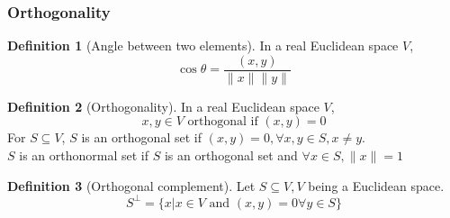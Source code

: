 \documentclass[twoside]{amsart}
\theoremstyle{plain}
\theoremstyle{definition}
\newtheorem{definition}{Definition}
\begin{document}
\subsubsection{Orthogonality}
\begin{definition}[Angle between two elements]
  In a real Euclidean space $V$, 
  \begin{equation}
    \cos{\theta} = \frac{(x,y)}{ \| x \| \| y \| }
  \end{equation}
\end{definition}

\begin{definition}[Orthogonality]
  In a real Euclidean space $V$,
  \begin{equation}
    x,y \in V \text{ orthogonal if } (x,y) = 0
  \end{equation}
  For $S \subseteq V$, $S$ is an orthogonal set if $(x,y) = 0, \forall x,y \in S, x \neq y$.  \\
  $S$ is an orthonormal set if $S$ is an orthogonal set and $\forall x \in S, \| x \| =1 $
\end{definition}

\begin{definition}[Orthogonal complement]
  Let $S \subseteq V, V$ being a Euclidean space. \\
  \begin{equation}
    S^{\perp} = \{ x | x \in V \text{ and } (x,y) =0 \forall y \in S \}
    \end{equation}
\end{definition}
\end{document}
